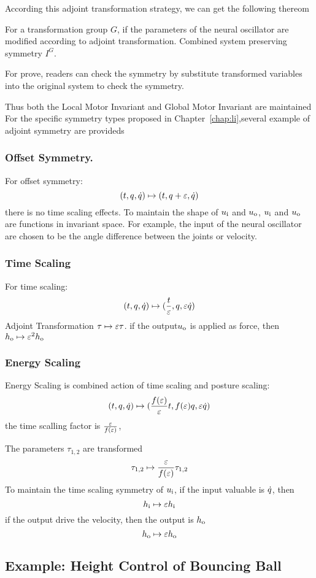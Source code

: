 According this adjoint transformation strategy, we can get the following thereom
\begin{mythe}
For a transformation group $G$, if the parameters of the neural oscillator are modified according to adjoint transformation.
 Combined system preserving symmetry $I^G$.
\end{mythe}
For prove, readers can check the symmetry by substitute transformed variables into the original system to check the symmetry.

Thus both the Local Motor Invariant and Global Motor Invariant are maintained
For the specific symmetry types proposed in Chapter~\ref{chap:li},several example of adjoint symmetry are provideds


\subsubsection*{ Offset Symmetry.}
For offset symmetry:
\[
(t,q,\dot{q}) \mapsto (t,q+\varepsilon,\dot{q})
\]
there is no time scaling effects.
To maintain the shape of $u_{\mathrm{i}}$ and $u_{\mathrm{o}}$,  $u_{\mathrm{i}}$ and $u_{\mathrm{o}}$ are functions in invariant space.
For example, the input of the neural oscillator are chosen to be the angle difference between the joints or velocity.



\subsubsection*{Time Scaling}
For time scaling:
\[
(t,q,\dot{q}) \mapsto (\frac{t}{\varepsilon},q,\varepsilon \dot{q})
\]
Adjoint Transformation
$\tau \mapsto \varepsilon \tau $.
if the output$u_{\mathrm{o}}$ is applied as force, then $h_{\mathrm{o}} \mapsto \varepsilon^2 h_{\mathrm{o}}$

\subsubsection*{ Energy Scaling}
Energy Scaling is combined action of time scaling and posture scaling:
\[
(t,q,\dot{q} ) \mapsto ( \frac{f(\varepsilon)}{\varepsilon}t ,f(\varepsilon)q,\varepsilon\dot{q})
\]
the time scalling factor is $\frac{\varepsilon}{f(\varepsilon)}$, 

The parameters $\tau_{1,2}$ are transformed
\[
\tau_{1,2} \mapsto \frac{\varepsilon}{f(\varepsilon)} \tau_{1,2}
\]
To maintain the time scaling symmetry of $u_{\mathrm{i}}$, if the input valuable is $\dot{q}$, 
then 
\[
h_{\mathrm{i}} \mapsto \varepsilon h_{\mathrm{i}}
\]
if the output drive the velocity, then the output is $h_{\mathrm{o}}$
\[
h_{\mathrm{o}} \mapsto \varepsilon h_{\mathrm{o}}
\]




\subsection{Example: Height Control of Bouncing Ball}

